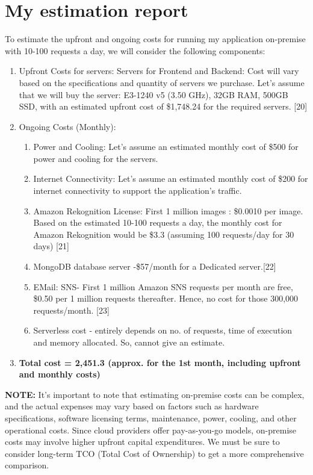 \section{My estimation report}
To estimate the upfront and ongoing costs for running my application on-premise with 10-100 requests a day, we will consider the following components:
\begin{enumerate}
    \item Upfront Costs for servers:
Servers for Frontend and Backend: Cost will vary based on the specifications and quantity of servers we purchase. Let's assume that we will buy the server: E3-1240 v5 (3.50 GHz), 32GB RAM, 500GB SSD, with an  estimated upfront cost of \$1,748.24 for the required servers. [20] 

    \item Ongoing Costs (Monthly):
    \begin{enumerate}
        \item  Power and Cooling: Let's assume an estimated monthly cost of \$500 for power and cooling for the servers.
        \item Internet Connectivity: Let's assume an estimated monthly cost of \$200 for internet connectivity to support the application's traffic.
        \item Amazon Rekognition License: First 1 million images : \$0.0010 per image. Based on the estimated 10-100 requests a day, the monthly cost for Amazon Rekognition would be \$3.3 (assuming 100 requests/day for 30 days) [21]
        \item MongoDB database server -\$57/month for a Dedicated server.[22]
        \item EMail: SNS- First 1 million Amazon SNS requests per month are free, \$0.50 per 1 million requests thereafter. Hence, no cost for those 300,000 requests/month. [23]
        \item Serverless cost - entirely depends on no. of requests, time of execution and memory allocated. So, cannot give an estimate.
    \end{enumerate}
   \item \textbf{Total cost = 2,451.3 (approx. for the 1st month, including upfront and monthly costs)}

\end{enumerate}
    

\textbf{NOTE:}
It's important to note that estimating on-premise costs can be complex, and the actual expenses may vary based on factors such as hardware specifications, software licensing terms, maintenance, power, cooling, and other operational costs. Since cloud providers offer pay-as-you-go models, on-premise costs may involve higher upfront capital expenditures. We must be sure to consider long-term TCO (Total Cost of Ownership) to get a more comprehensive comparison.


